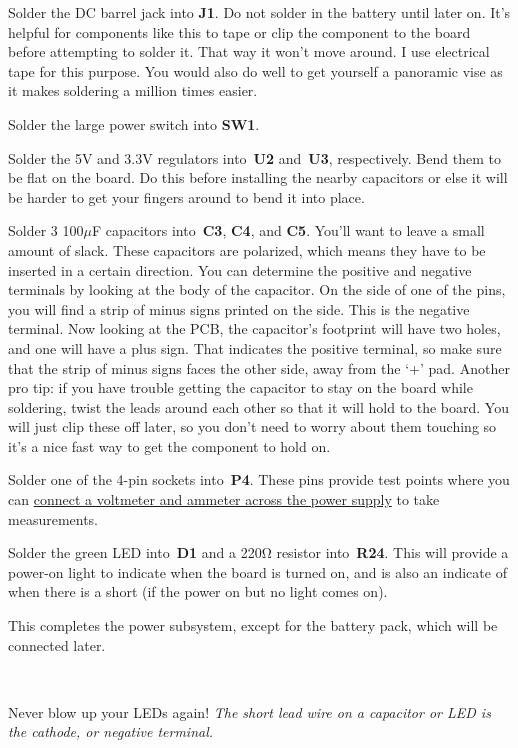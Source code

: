 Solder the DC barrel jack into \textbf{J1}. Do not solder in the
battery until later on. It's helpful for components like this to tape
or clip the component to the board before attempting to solder it.
That way it won't move around. I use electrical tape for this purpose.
You would also do well to get yourself a panoramic vise as it makes
soldering a million times easier.

Solder the large power switch into \textbf{SW1}.

Solder the 5V and 3.3V regulators into~\textbf{U2} and~\textbf{U3},
respectively. Bend them to be flat on the board. Do this before
installing the nearby capacitors or else it will be harder to get your
fingers around to bend it into place.

Solder 3 100$\mu$F capacitors into~\textbf{C3}, \textbf{C4}, and
\textbf{C5}. You'll want to leave a small amount of slack. These
capacitors are polarized, which means they have to be inserted in a
certain direction. You can determine the positive and negative
terminals by looking at the body of the capacitor. On the side of one
of the pins, you will find a strip of minus signs printed on the side.
This is the negative terminal. Now looking at the PCB, the capacitor's
footprint will have two holes, and one will have a plus sign. That
indicates the positive terminal, so make sure that the strip of minus
signs faces the other side, away from the `+' pad. Another pro tip: if
you have trouble getting the capacitor to stay on the board while
soldering, twist the leads around each other so that it will hold to
the board. You will just clip these off later, so you don't need to
worry about them touching so it's a nice fast way to get the component
to hold on.

Solder one of the 4-pin sockets into~\textbf{P4}. These pins provide
test points where you can
\href{Taking-Test-Measurements_9732196.html}{connect a voltmeter and
ammeter across the power supply} to take measurements.

Solder the green LED into~\textbf{D1} and a 220Ω resistor
into~\textbf{R24}. This will provide a power-on light to indicate when
the board is turned on, and is also an indicate of when there is a
short (if the power on but no light comes on).

This completes the power subsystem, except for the battery pack, which
will be connected later.

~

\begin{bclogo}[couleur=bgblue, arrondi =0 , logo=\bcbombe, barre=none,noborder=true]{Never blow up your LEDs again!}
\itshape The short lead wire on a capacitor or LED is the cathode, or negative terminal.
\end{bclogo}



